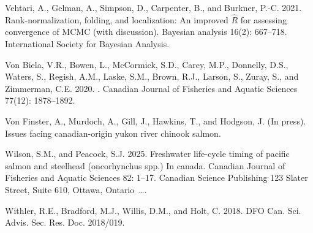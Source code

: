 \documentclass[11pt]{book}
\begin{document}
\begin{CSLReferences}{1}{0}
%
Vehtari, A., Gelman, A., Simpson, D., Carpenter, B., and Burkner, P.-C. 2021. Rank-normalization, folding, and localization: An improved \(\hat{R}\) for assessing convergence of {MCMC} (with discussion). Bayesian analysis 16(2): 667--718. International Society for Bayesian Analysis.

%
Von Biela, V.R., Bowen, L., McCormick, S.D., Carey, M.P., Donnelly, D.S., Waters, S., Regish, A.M., Laske, S.M., Brown, R.J., Larson, S., Zuray, S., and Zimmerman, C.E. 2020. . Canadian Journal of Fisheries and Aquatic Sciences 77(12): 1878--1892.

%
Von Finster, A., Murdoch, A., Gill, J., Hawkins, T., and Hodgson, J. (In press). Issues facing canadian-origin yukon river chinook salmon.

%
Wilson, S.M., and Peacock, S.J. 2025. Freshwater life-cycle timing of pacific salmon and steelhead (oncorhynchus spp.) In canada. Canadian Journal of Fisheries and Aquatic Sciences 82: 1--17. Canadian Science Publishing 123 Slater Street, Suite 610, Ottawa, Ontario~\ldots.

%
Withler, R.E., Bradford, M.J., Willis, D.M., and Holt, C. 2018. DFO Can. Sci. Advis. Sec. Res. Doc. 2018/019.

\end{CSLReferences}
\setlength{\parindent}{0in} \setlength{\leftskip}{0in} \setlength{\parskip}{4pt}

\Appendices


\clearpage

\label{app:first-appendix}
\end{document}
